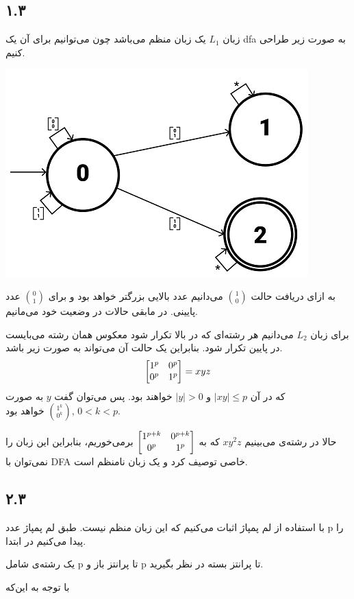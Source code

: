 \subsection*{۱.۳}

زبان
$L_1$
یک زبان منظم می‌باشد چون می‌توانیم برای آن یک 
dfa
به صورت زیر طراحی کنیم.

\begin{center}
	\includegraphics{DFA24}
\end{center}

به ازای دریافت حالت
$\binom{1}{0}$
می‌دانیم عدد بالایی بزرگتر خواهد بود و برای
$\binom{0}{1}$
عدد پایینی. در مابقی حالات در وضعیت خود می‌مانیم.

برای زبان
$L_2$
می‌دانیم هر رشته‌ای که در بالا تکرار شود معکوس همان رشته می‌بایست در پایین تکرار شود. بنابراین یک حالت آن می‌تواند به صورت زیر باشد.
$$\mqty[1^p & 0^p \\ 0^p & 1^p] = x y z$$
که در آن
$|x y| \leq p$
و
$|y| > 0$
خواهند بود. پس می‌توان گفت
$y$
به صورت
$\binom{1^k}{0^k},\, 0 < k < p$
خواهد بود.

حالا در رشته‌ی می‌بینیم
$x y^2 z$
که به
$\mqty[1^{p + k} & 0^{p + k} \\ 0^p & 1^p]$
برمی‌خوریم، بنابراین این زبان را نمی‌توان با
DFA
خاصی توصیف کرد و یک زبان نامنظم است.

\subsection*{۲.۳}

با استفاده از لم پمپاژ اثبات می‌کنیم که این زبان منظم نیست. طبق لم پمپاژ عدد p را پیدا می‌کنیم در ابتدا.

یک رشته‌ی شامل p تا پرانتز باز و p تا پرانتز بسته در نظر بگیرید.

با توجه به این‌که

